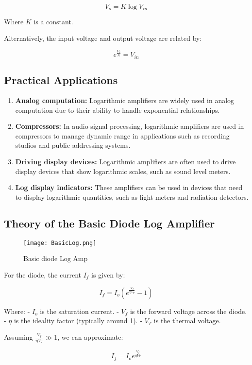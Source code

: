 \documentclass[a4paper,9pt,twoside,openany,twocolumn]{memoir}
\begin{document}
\[
V_o = K \log V_{in}
\]

Where \( K \) is a constant.

Alternatively, the input voltage and output voltage are related by:

\[
e^{\frac{V_o}{K}} = V_{in}
\]

\subsection*{Practical Applications}
\begin{enumerate}
    \item \textbf{Analog computation:} Logarithmic amplifiers are widely used in analog computation due to their ability to handle exponential relationships.
    \item \textbf{Compressors:} In audio signal processing, logarithmic amplifiers are used in compressors to manage dynamic range in applications such as recording studios and public addressing systems.
    \item \textbf{Driving display devices:} Logarithmic amplifiers are often used to drive display devices that show logarithmic scales, such as sound level meters.
    \item \textbf{Log display indicators:} These amplifiers can be used in devices that need to display logarithmic quantities, such as light meters and radiation detectors.
\end{enumerate}

\subsection*{Theory of the Basic Diode Log Amplifier}
\begin{figure}[H]
    \centering
    \texttt{[image: BasicLog.png]}
    \caption{Basic diode Log Amp}
    \label{fig:question_image}
\end{figure}

For the diode, the current \( I_f \) is given by:

\[
I_f = I_o \left( e^{\frac{V_f}{\eta V_T}} - 1 \right) \tag{1}
\]

Where:
- \( I_o \) is the saturation current.
- \( V_f \) is the forward voltage across the diode.
- \( \eta \) is the ideality factor (typically around 1).
- \( V_T \) is the thermal voltage.

Assuming \( \frac{V_f}{\eta V_T} \gg 1 \), we can approximate:

\[
I_f = I_o e^{\frac{V_f}{\eta V_T}} \tag{2}
\]
\end{document}
